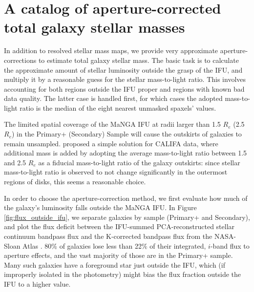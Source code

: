\section{A catalog of aperture-corrected total galaxy stellar masses}
\label{chap2:sec:mstar_catalog}

In addition to resolved stellar mass maps, we provide very approximate aperture-corrections to estimate total galaxy stellar mass. The basic task is to calculate the approximate amount of stellar luminosity outside the grasp of the IFU, and multiply it by a reasonable guess for the stellar mass-to-light ratio. This involves accounting for both regions outside the IFU proper and regions with known bad data quality. The latter case is handled first, for which cases the adopted mass-to-light ratio is the median of the eight nearest unmasked spaxels' values.

The limited spatial coverage of the MaNGA IFU at radii larger than 1.5 $R_e$ (2.5 $R_e$) in the Primary+ (Secondary) Sample will cause the outskirts of galaxies to remain unsampled. \citet{gonzalez-delgado_14} proposed a simple solution for CALIFA data, where additional mass is added by adopting the average mass-to-light ratio between 1.5 and 2.5 $R_e$ as a fiducial mass-to-light ratio of the galaxy outskirts: since stellar mass-to-light ratio is observed to not change significantly in the outermost regions of disks, this seems a reasonable choice.

In order to choose the aperture-correction method, we first evaluate how much of the galaxy's luminosity falls outside the MaNGA IFU. In Figure \ref{fig:flux_outside_ifu}, we separate galaxies by sample (Primary+ and Secondary), and plot the flux deficit between the IFU-summed PCA-reconstructed stellar continuum bandpass flux and the K-corrected bandpass flux from the NASA-Sloan Atlas \citep{blanton_roweis_07}. 80\% of galaxies lose less than 22\% of their integrated, $i$-band flux to aperture effects, and the vast majority of those are in the Primary+ sample. Many such galaxies have a foreground star just outside the IFU, which (if improperly isolated in the photometry) might bias the flux fraction outside the IFU to a higher value.

